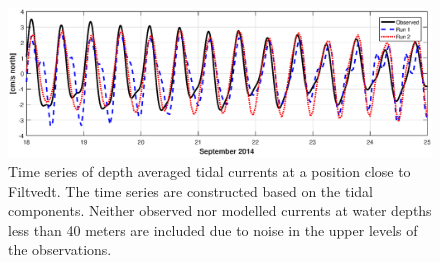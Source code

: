 \begin{figure}[!t]
\centering
\includegraphics[width=\textwidth]{fig_Filtvedt_timeseries}
\caption{Time series of depth averaged tidal currents at a position close to Filtvedt. The time series are constructed based on the tidal components. Neither observed nor modelled currents at water depths less than 40 meters are included due to noise in the upper levels of the observations.}
\label{fig:Filtvedt_timeseries}
\end{figure}



